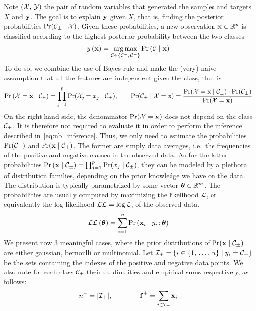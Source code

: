 Note $\left( \mathcal{X},\, \mathcal{Y} \right)$ the pair of random variables that generated the samples and targets $X$ and $\mathbf{y}$.
The goal is to explain $\mathbf{y}$ given $X$, that is, finding the posterior probabilities $\Pr(\mathcal{C}_\pm \mid \mathcal{X})$.
Given these probabilities, a new observation $\mathbf{x} \in \mathbb{R}^p$ is classified according to the highest
posterior probability between the two classes
\begin{equation}\label{eq:nb_inference}
    y\left( \mathbf{x} \right) = \underset{\mathcal{C} \in \left\{ \mathcal{C}^-,\, \mathcal{C}^+ \right\}}{\operatorname*{arg\,max}} \Pr\left( \mathcal{C} \mid \mathbf{x} \right)
\end{equation}
To do so, we combine the use of Bayes rule and make the (very) naive assumption that
all the features are independent given the class, that is
\begin{equation}
    \Pr\left( \mathcal{X} = \mathbf{x} \mid \mathcal{C}_\pm \right) = \prod_{j = 1}^p \Pr(\mathcal{X}_j = x_j \mid \mathcal{C}_\pm)
    ,\qquad
    \Pr(\mathcal{C}_\pm \mid \mathcal{X} = \mathbf{x}) = \frac{\Pr(\mathcal{X} = \mathbf{x} \mid \mathcal{C}_\pm) \cdot \Pr(\mathcal{C}_\pm)}{\Pr(\mathcal{X} = \mathbf{x})}
\end{equation}
On the right hand side,
the denominator $\Pr(\mathcal{X} = \mathbf{x})$ does not depend on the class $\mathcal{C}_\pm$.
It is therefore not required to evaluate it in order to perform the inference described in~\ref{eq:nb_inference}.
Thus, we only need to estimate the probabilities $\Pr(\mathcal{C}_\pm)$ and $\Pr(\mathbf{x} \mid \mathcal{C}_\pm)$.
The former are simply data averages, i.e.\ the frequencies of the positive and negative classes in the observed data.
As for the latter probabilities $\Pr\left( \mathbf{x} \mid \mathcal{C}_\pm \right) = \prod_{j = 1}^p \Pr(x_j \mid \mathcal{C}_\pm)$,
they can be modeled by a plethora of distribution families, depending on the prior knowledge we have on the data.
The distribution is typically parametrized by some vector $\bm{\theta} \in \mathbb{R}^m$.
The probabilities are usually computed by maximizing the likelihood $\mathcal{L}$,
or equivalently the log-likelihood $\mathcal{L}\mathcal{L} = \log\mathcal{L}$, of the observed data.
\begin{equation*}
    \mathcal{L}\mathcal{L}\left( \bm{\theta} \right) = \sum_{i = 1}^n \Pr\left( \mathbf{x}_i \mid y_i \,; \bm{\theta} \right)
\end{equation*}
We present now 3 meaningful cases, where the prior distributions of $\Pr(\mathbf{x} \mid \mathcal{C}_\pm)$ are either
gaussian, bernoulli or multinomial.
Let $\mathcal{I}_\pm = \left\{ i \in \left\{ 1,\, \dots,\, n \right\} \mid y_i = \mathcal{C}_\pm \right\}$ be the sets containing the
indexes of the positive and negative data points.
We also note for each class $\mathcal{C}_\pm$ their cardinalities and empirical sums respectively, as follows:
\begin{equation*}
    n^\pm = | \mathcal{I}_\pm |,
    \qquad\qquad
    \mathbf{f}^\pm = \sum_{i \in \mathcal{I}_\pm} \mathbf{x}_i
\end{equation*}

